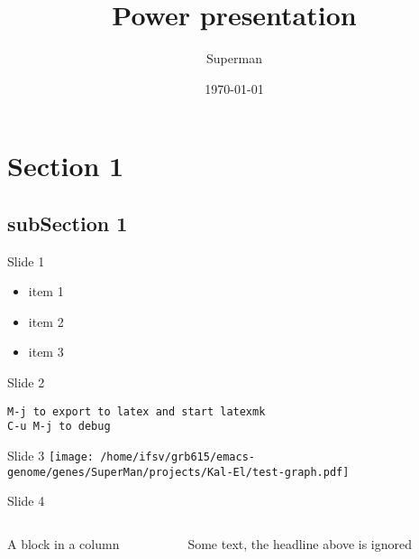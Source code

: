 \documentclass{beamer}
\author{Superman}
\date{\today}
\title{Power presentation}
\begin{document}
\maketitle
\section{Section 1}
\label{sec-1}
\subsection{subSection 1}
\label{sec-1-1}
\begin{frame}[label=sec-1-1-1]{Slide 1}
\begin{itemize}
\item item 1
\item item 2
\item item 3
\end{itemize}
\end{frame}
\begin{frame}[fragile,label=sec-1-1-2]{Slide 2}
 \lstset{basicstyle=\small\tt,numbers=left,language=Lisp}
\begin{lstlisting}
M-j to export to latex and start latexmk
C-u M-j to debug
\end{lstlisting}
\end{frame}
\begin{frame}[label=sec-1-1-3]{Slide 3}
\texttt{[image: /home/ifsv/grb615/emacs-genome/genes/SuperMan/projects/Kal-El/test-graph.pdf]}
\end{frame}
\begin{frame}[label=sec-1-1-4]{Slide 4}
\begin{columns}
\begin{column}{0.5\textwidth}
\begin{block}{A block in a column}

\end{block}
\end{column}
\begin{column}{0.5\textwidth}
Some text, the headline above is ignored

\end{column}
\end{columns}
\end{frame}
\end{document}
